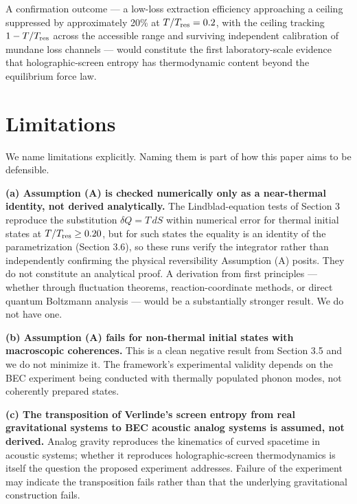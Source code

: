 \documentclass[11pt]{article}
\begin{document}
A confirmation outcome --- a low-loss extraction efficiency approaching a ceiling suppressed by approximately 20\% at \(T/T_{\rm res} = 0.2\), with the ceiling tracking \(1 - T/T_{\rm res}\) across the accessible range and surviving independent calibration of mundane loss channels --- would constitute the first laboratory-scale evidence that holographic-screen entropy has thermodynamic content beyond the equilibrium force law.

\section{Limitations}\label{limitations}

We name limitations explicitly. Naming them is part of how this paper aims to be defensible.

\textbf{(a) Assumption (A) is checked numerically only as a near-thermal identity, not derived analytically.} The Lindblad-equation tests of Section 3 reproduce the substitution \(\delta Q = T\,dS\) within numerical error for thermal initial states at \(T/T_{\rm res} \geq 0.20\), but for such states the equality is an identity of the parametrization (Section 3.6), so these runs verify the integrator rather than independently confirming the physical reversibility Assumption (A) posits. They do not constitute an analytical proof. A derivation from first principles --- whether through fluctuation theorems, reaction-coordinate methods, or direct quantum Boltzmann analysis --- would be a substantially stronger result. We do not have one.

\textbf{(b) Assumption (A) fails for non-thermal initial states with macroscopic coherences.} This is a clean negative result from Section 3.5 and we do not minimize it. The framework's experimental validity depends on the BEC experiment being conducted with thermally populated phonon modes, not coherently prepared states.

\textbf{(c) The transposition of Verlinde's screen entropy from real gravitational systems to BEC acoustic analog systems is assumed, not derived.} Analog gravity reproduces the kinematics of curved spacetime in acoustic systems; whether it reproduces holographic-screen thermodynamics is itself the question the proposed experiment addresses. Failure of the experiment may indicate the transposition fails rather than that the underlying gravitational construction fails.
\end{document}
